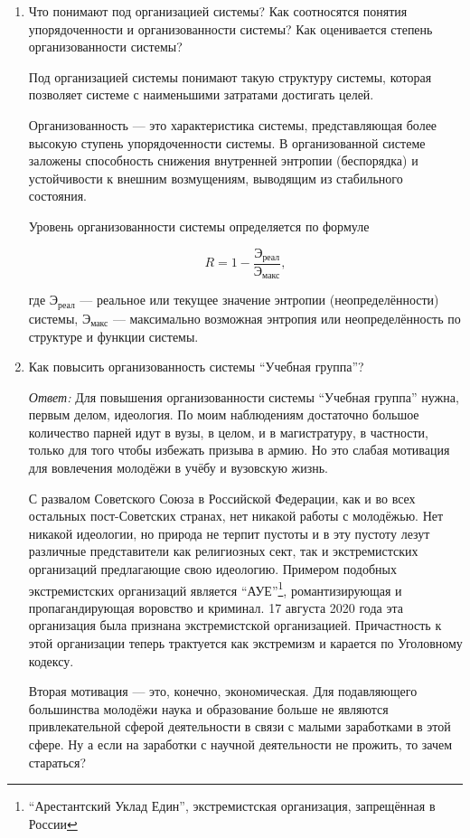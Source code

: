 \documentclass[10pt]{article}
\begin{document}
\begin{enumerate}
\item{Что понимают под организацией системы? Как соотносятся понятия упорядоченности и организованности системы? Как оценивается степень организованности системы?}

  Под организацией системы понимают такую структуру системы, которая позволяет системе с наименьшими затратами достигать целей.

  Организованность --- это характеристика системы, представляющая более высокую ступень упорядоченности системы. В организованной системе заложены способность снижения внутренней энтропии (беспорядка) и устойчивости к внешним возмущениям, выводящим из стабильного состояния.

  Уровень организованности системы определяется по формуле

  $$R = 1 - \dfrac {\text {Э}_{\text{реал}}} {\text {Э}_{\text{макс}}},$$

  где $\text{Э}_{\text{реал}}$ --- реальное или текущее значение энтропии (неопределённости) системы, $\text{Э}_{\text{макс}}$ --- максимально возможная энтропия или неопределённость по структуре и функции системы.

\item{Как повысить организованность системы ``Учебная группа''?}

  \emph{Ответ:} Для повышения организованности системы ``Учебная группа'' нужна, первым делом, идеология. По моим наблюдениям достаточно большое количество парней идут в вузы, в целом, и в магистратуру, в частности, только для того чтобы избежать призыва в армию. Но это слабая мотивация для вовлечения молодёжи в учёбу и вузовскую жизнь.

  С развалом Советского Союза в Российской Федерации, как и во всех остальных пост-Советских странах, нет никакой работы с молодёжью. Нет никакой идеологии, но природа не терпит пустоты и в эту пустоту лезут различные представители как религиозных сект, так и экстремистских организаций предлагающие свою идеологию. Примером подобных экстремистских организаций является ``АУЕ''\footnote{``Арестантский Уклад Един'', экстремистская организация, запрещённая в России}, романтизирующая и пропагандирующая воровство и криминал. 17 августа 2020 года эта организация была признана экстремистской организацией. Причастность к этой организации теперь трактуется как экстремизм и карается по Уголовному кодексу.

  Вторая мотивация --- это, конечно, экономическая. Для подавляющего большинства молодёжи наука и образование больше не являются привлекательной сферой деятельности в связи с малыми заработками в этой сфере. Ну а если на заработки с научной деятельности не прожить, то зачем стараться?


\end{enumerate}
\end{document}
